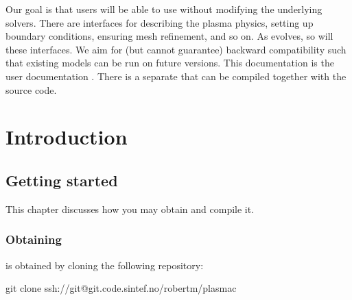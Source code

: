 \documentclass[letterpaper,10pt,english]{sphinxmanual}
\begin{document}
Our goal is that users will be able to use  without modifying the underlying solvers.
There are interfaces for describing the plasma physics, setting up boundary conditions, ensuring mesh refinement, and so on.
As  evolves, so will these interfaces.
We aim for (but cannot guarantee) backward compatibility such that existing  models can be run on future versions.
This documentation is the user documentation . There is a separate  that can be compiled together with the source code.


\chapter{Introduction}
\label{\detokenize{index:introduction}}\label{\detokenize{index:chap-introduction}}

\section{Getting started}
\label{\detokenize{GettingStarted:getting-started}}\label{\detokenize{GettingStarted:chap-gettingstarted}}\label{\detokenize{GettingStarted::doc}}
This chapter discusses how you may obtain  and compile it.


\subsection{Obtaining }
\label{\detokenize{GettingStarted:obtaining-plasmac}}\label{\detokenize{GettingStarted:chap-obtaining}}
 is obtained by cloning the following repository:

\begin{sphinxVerbatim}[commandchars=\\\{\},formatcom=\scriptsize]
git clone ssh://git@git.code.sintef.no/\PYGZti{}robertm/plasmac
\end{sphinxVerbatim}
\end{document}
